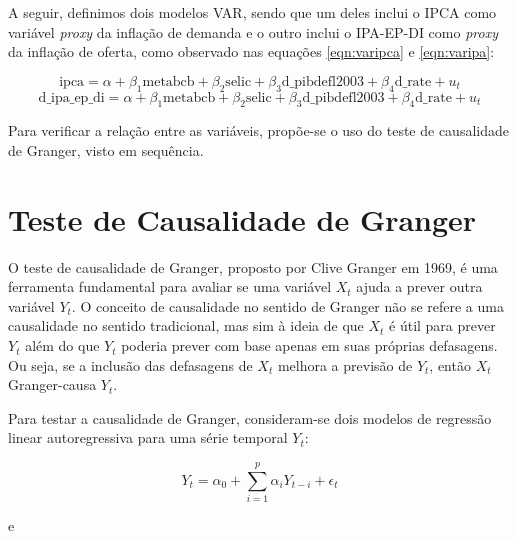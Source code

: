 \documentclass[12pt,oneside,a4paper,chapter=TITLE,english,brazil,sumario=abnt-6027-2012]{abntex2}
\begin{document}
\vspace{-0.2cm}
\vspace{0.5cm}


A seguir, definimos dois modelos VAR, sendo que um deles inclui o IPCA como variável \textit{proxy} da inflação de demanda e o outro inclui o IPA-EP-DI como \textit{proxy} da inflação de oferta, como observado nas equações \ref{eqn:varipca} e \ref{eqn:varipa}:

\begin{equation}
	\label{eqn:varipca}
	\text{ipca} = \alpha +  \beta_{1}\text{metabcb} + \beta_{2}\text{selic} + \beta_{3}\text{d\_pibdefl2003} + \beta_{4}\text{d\_rate} + u_{t}
\end{equation}
\begin{equation}
	\label{eqn:varipa}
	\text{d\_ipa\_ep\_di} = \alpha +  \beta_{1}\text{metabcb} + \beta_{2}\text{selic} + \beta_{3}\text{d\_pibdefl2003} + \beta_{4}\text{d\_rate} + u_{t}
\end{equation}
\vspace{0ex}

Para verificar a relação entre as variáveis, propõe-se o uso do teste de causalidade de Granger, visto em sequência.

\section{Teste de Causalidade de Granger}

O teste de causalidade de Granger, proposto por Clive Granger em 1969, é uma ferramenta fundamental para avaliar se uma variável \( X_t \) ajuda a prever outra variável \( Y_t \). O conceito de causalidade no sentido de Granger não se refere a uma causalidade no sentido tradicional, mas sim à ideia de que \( X_t \) é útil para prever \( Y_t \) além do que \( Y_t \) poderia prever com base apenas em suas próprias defasagens. Ou seja, se a inclusão das defasagens de \( X_t \) melhora a previsão de \( Y_t \), então \( X_t \) Granger-causa \( Y_t \).

Para testar a causalidade de Granger, consideram-se dois modelos de regressão linear autoregressiva para uma série temporal \( Y_t \):

\begin{equation}
	Y_t = \alpha_0 + \sum_{i=1}^{p} \alpha_i Y_{t-i} + \epsilon_t
\end{equation}

e
\end{document}
